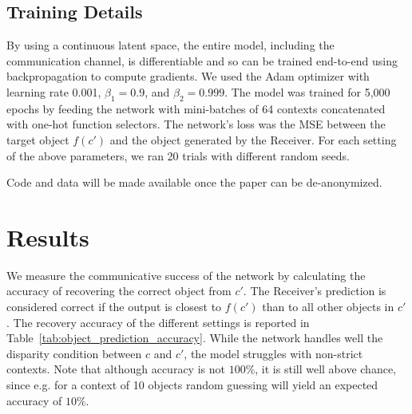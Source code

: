 \documentclass[11pt,a4paper]{article}
\begin{document}
\subsection{Training Details}

By using a continuous latent space, the entire model, including the communication channel, is differentiable and so can be trained end-to-end using backpropagation to compute gradients.  We used the Adam optimizer \citep{Kingma2015} with learning rate 0.001, $\beta_1 = 0.9$, and $\beta_2 = 0.999$. The model was trained for 5,000 epochs by feeding the network with mini-batches of 64 contexts concatenated with one-hot function selectors. The network's loss was the MSE between the target object $f(c')$ and the object generated by the Receiver. For each setting of the above parameters, we ran 20 trials with different random seeds.

Code and data will be made available once the paper can be de-anonymized. 

\section{Results}

We measure the communicative success of the network by calculating the accuracy of recovering the correct object from $c'$. The Receiver's prediction is considered correct if the output is closest to $f(c')$ than to all other objects in $c'$. The recovery accuracy of the different settings is reported in Table~\ref{tab:object_prediction_accuracy}. While the network handles well the disparity condition between $c$ and $c'$, the model struggles with non-strict contexts. Note that although accuracy is not $100\%$, it is still well above chance, since e.g. for a context of 10 objects random guessing will yield an expected accuracy of $10\%$. 
\end{document}
